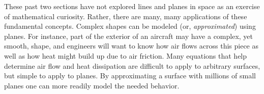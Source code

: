 These past two sections have not explored lines and planes in space as an exercise of mathematical curiosity. Rather, there are many, many applications of these fundamental concepts. Complex shapes can be modeled (or, \textit{approximated}) using planes. For instance, part of the exterior of an aircraft may have a complex, yet smooth, shape, and engineers will want to know how air flows across this piece as well as how heat might build up due to air friction. Many equations that help determine air flow and heat dissipation are difficult to apply to arbitrary surfaces, but simple to apply to planes. By approximating a surface with millions of small planes one can more readily model the needed behavior.


